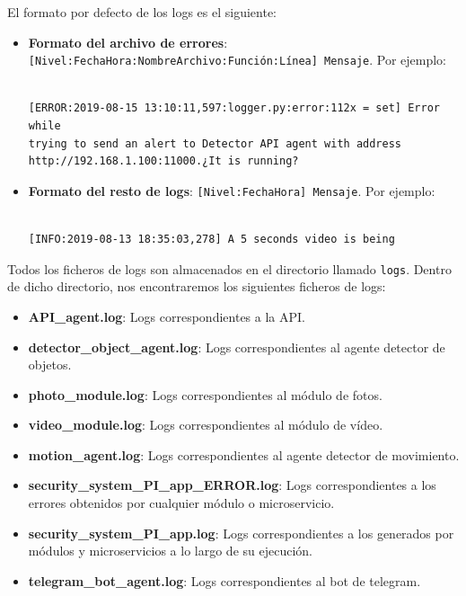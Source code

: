 El formato por defecto de los logs es el siguiente:

\begin{itemize}
\item \textbf{Formato del archivo de errores}: \texttt{[Nivel:FechaHora:NombreArchivo:Función:Línea] Mensaje}. Por ejemplo:

\vspace{-1cm}

\begin{verbatim}

[ERROR:2019-08-15 13:10:11,597:logger.py:error:112x = set] Error while
trying to send an alert to Detector API agent with address 
http://192.168.1.100:11000.¿It is running?

\end{verbatim}


\vspace{-1cm}

\item \textbf{Formato del resto de logs}: \texttt{[Nivel:FechaHora] Mensaje}. Por ejemplo:

\vspace{-1.2cm}

\begin{verbatim}

[INFO:2019-08-13 18:35:03,278] A 5 seconds video is being 

\end{verbatim}

\end{itemize}

\vspace{-1.2cm}

Todos los ficheros de logs son almacenados en el directorio llamado \texttt{logs}. Dentro de dicho directorio, nos encontraremos los siguientes ficheros de logs:

\vspace{-0.4cm}

\begin{itemize}
\item \textbf{API\_agent.log}: Logs correspondientes a la API.
\item \textbf{detector\_object\_agent.log}: Logs correspondientes al agente detector de objetos.
\item \textbf{photo\_module.log}: Logs correspondientes al módulo de fotos.
\item \textbf{video\_module.log}: Logs correspondientes al módulo de vídeo.
\item \textbf{motion\_agent.log}: Logs correspondientes al agente detector de movimiento.
\item \textbf{security\_system\_PI\_app\_ERROR.log}: Logs correspondientes a los errores obtenidos por cualquier módulo o microservicio.
\item \textbf{security\_system\_PI\_app.log}: Logs correspondientes a los generados por módulos y microservicios a lo largo de su ejecución.
\item \textbf{telegram\_bot\_agent.log}: Logs correspondientes al bot de telegram.

\end{itemize}

